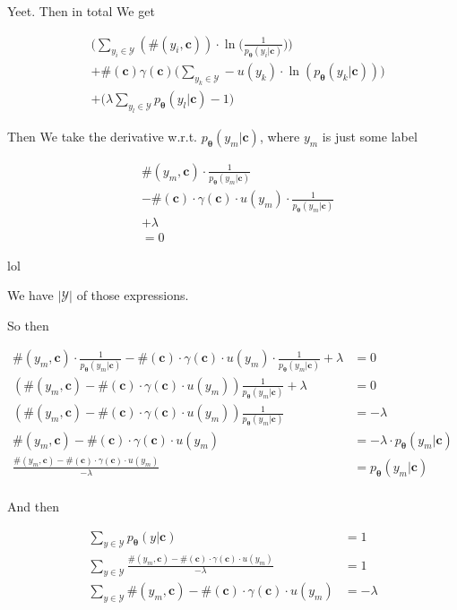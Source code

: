 \documentclass{article}
\newcommand{\vtheta}{\boldsymbol{\theta}}
\newcommand{\model}{p_{\vtheta}}
\newcommand{\context}{\boldsymbol{c}}
\begin{document}
		Yeet. Then in total We get 
		
		\begin{align}
			&\bigg(\sum_{y_i\in\mathcal{Y}} (\#(y_i, \context))\cdot  \ln\bigg(\frac{1}{\model(y_i|\context)} 	\bigg)\bigg) \\
			&+ \#(\context)\gamma(\context)\bigg(\sum_{y_k\in\mathcal{Y}} - u(y_k)\cdot\ln(\model(y_k|\context))\bigg) \\
			&+ \bigg(\lambda\sum_{y_l\in\mathcal{Y}} \model(y_l|\context) -1\bigg) 
		\end{align}	
		
		Then We take the derivative w.r.t. $\model(y_m|\context)$, where $y_m$ is just some label
		
		\begin{align}
			&\#(y_m, \context)\cdot  \frac{1}{\model(y_m|\context)} 	 \\
			&- \#(\context)\cdot \gamma(\context)\cdot u(y_m)\cdot\frac{1}{\model(y_m|\context)} \\
			&+ \lambda \\
			&=0
		\end{align}	
		
		lol
		
		We have $|\mathcal{Y}|$ of those expressions. 
		
		So then 
		
		\begin{align}
			\#(y_m, \context)\cdot  \frac{1}{\model(y_m|\context)} - \#(\context)\cdot \gamma(\context)\cdot u(y_m)\cdot\frac{1}{\model(y_m|\context)} + \lambda &= 0\\
			(\#(y_m, \context) - \#(\context)\cdot \gamma(\context)\cdot u(y_m))   \frac{1}{\model(y_m|\context)} + \lambda &= 0\\
			(\#(y_m, \context) - \#(\context)\cdot \gamma(\context)\cdot u(y_m))   \frac{1}{\model(y_m|\context)} &= - \lambda \\
			\#(y_m, \context) - \#(\context)\cdot \gamma(\context)\cdot u(y_m)  &= - \lambda\cdot \model(y_m|\context) \\
			\frac{\#(y_m, \context) - \#(\context)\cdot \gamma(\context)\cdot u(y_m)}{-\lambda}  &=  \model(y_m|\context) \\
		\end{align}	
		
		And then
		
		\begin{align}
			\sum_{y\in\mathcal{Y}} \model(y|\context) &= 1\\
			\sum_{y\in\mathcal{Y}} \frac{\#(y_m, \context) - \#(\context)\cdot \gamma(\context)\cdot u(y_m)}{-\lambda} &= 1\\
			  \sum_{y\in\mathcal{Y}} \#(y_m, \context) - \#(\context)\cdot \gamma(\context)\cdot u(y_m) &= -\lambda\\
		\end{align}
		
\end{document}
